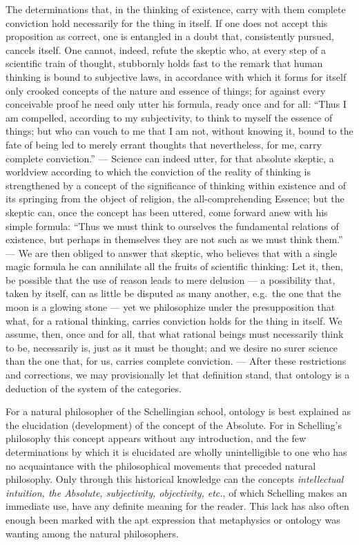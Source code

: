 \documentclass[12pt]{article}
\newcommand{\opage}[1]{\marginnote{\footnotesize\textit{[#1]}}}
\begin{document}
The determinations that, in the thinking of existence, carry with them complete
conviction hold necessarily for the thing in itself. If one does not accept this
proposition as correct, one is entangled in a doubt that, consistently pursued,
cancels itself. One cannot, indeed, refute the skeptic who, at every step of a
scientific train of thought, stubbornly holds fast to the remark that human
thinking is bound to subjective laws, in accordance with which it forms for
itself only crooked concepts of the nature and essence of things; for against
every conceivable proof he need only utter his formula, ready once and for all:
``Thus I am compelled, according to my subjectivity, to think \opage{193}to
myself the essence of things; but who can vouch to me that I am not, without
knowing it, bound to the fate of being led to merely errant thoughts that
nevertheless, for me, carry complete conviction.'' --- Science can indeed utter,
for that absolute skeptic, a worldview according to which the conviction of the
reality of thinking is strengthened by a concept of the significance of thinking
within existence and of its springing from the object of religion, the
all-comprehending Essence; but the skeptic can, once the concept has been uttered,
come forward anew with his simple formula: ``Thus we must think to ourselves the
fundamental relations of existence, but perhaps in themselves they are not such as
we must think them.'' --- We are then obliged to answer that skeptic, who believes
that with a single magic formula he can annihilate all the fruits of scientific
thinking: Let it, then, be possible that the use of reason leads to mere
delusion --- a possibility that, taken by itself, can as little be disputed as
many another, e.g.\ the one that the moon is a glowing stone --- yet we
philosophize under the presupposition that what, for a rational thinking, carries
conviction holds for the thing in itself. We assume, then, once and for all, that
what rational beings must necessarily think to be, necessarily is, just as it must
be thought; and we desire no surer science than the one that, for us, carries
complete conviction. --- After these restrictions and corrections, we may
provisionally let that definition stand, that ontology is a deduction of the
system of the categories.

For a natural philosopher of the Schellingian school, ontology is best explained
as the elucidation (development) of the concept of the Absolute. For in
Schelling's philosophy this concept appears without any introduction, and the few
determinations by which it is elucidated are wholly unintelligible to one who has
no acquaintance with the philosophical movements that preceded \opage{194}natural
philosophy. Only through this historical knowledge can the concepts
\emph{intellectual intuition, the Absolute, subjectivity, objectivity, etc.}, of
which Schelling makes an immediate use, have any definite meaning for the reader.
This lack has also often enough been marked with the apt expression that
metaphysics or ontology was wanting among the natural philosophers.
\end{document}
